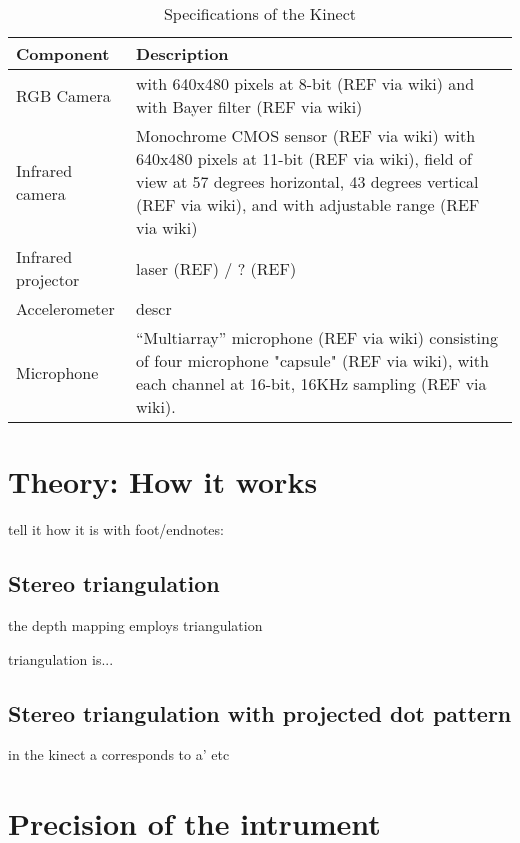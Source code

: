 %
\begin{table}[h]
\centering
\begin{tabular}{l l}
\toprule
Component & Description \\
\midrule

RGB Camera & with 640x480 pixels at 8-bit (REF via wiki) and with Bayer filter
(REF via wiki) \\

Infrared camera & Monochrome CMOS sensor (REF via wiki) with 640x480 pixels at
11-bit (REF via wiki), field of view at 57 degrees horizontal, 43 degrees
vertical (REF via wiki), and with adjustable range (REF via wiki) \\ Infrared
projector & laser (REF) / ? (REF) \\

Accelerometer & descr \\

Microphone & ``Multiarray'' microphone (REF via wiki) consisting of four
microphone "capsule" (REF via wiki), with each channel at 16-bit, 16KHz sampling
(REF via wiki). \\

\bottomrule
\end{tabular}
\caption{Specifications of the Kinect}
\label{tab:specs}
\end{table}

\section{Theory: How it works}
\label{howitworks}

tell it how it is with foot/endnotes:

\subsection{Stereo triangulation}

the depth mapping employs triangulation

triangulation is...

\subsection{Stereo triangulation with projected dot pattern}

in the kinect a corresponds to a' etc


\section{Precision of the intrument}
\label{precision}

